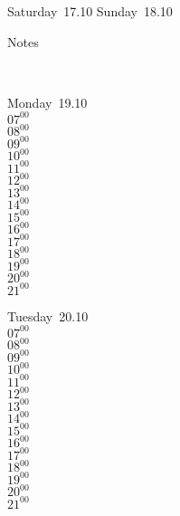 \documentclass[11pt,a4paper]{book}\usepackage[]{graphicx}\usepackage[]{color}
\begin{document}
{{{{{{{{{{{{{{{{\begin{tcolorbox}
\end{tcolorbox} 
\begin{tcolorbox}[height=(\textheight-10mm)/6]
Saturday~17.10
\tcblower
Sunday~18.10
\end{tcolorbox} %
\begin{tcolorbox}[height=(\textheight-10mm)/6,sidebyside=false]
Notes
\end{tcolorbox}
\clearpage
\vspace{2 mm}\\
\begin{tcolorbox}
Monday~19.10\\
{ 
  $07^{00}$\\
$08^{00}$\\
$09^{00}$\\
$10^{00}$\\
$11^{00}$\\
$12^{00}$\\
$13^{00}$\\
$14^{00}$\\
$15^{00}$\\
$16^{00}$\\
$17^{00}$\\
$18^{00}$\\
$19^{00}$\\
$20^{00}$\\
$21^{00}$}\\

\end{tcolorbox}
\begin{tcolorbox}
Tuesday~20.10\\
{ 
  $07^{00}$\\
$08^{00}$\\
$09^{00}$\\
$10^{00}$\\
$11^{00}$\\
$12^{00}$\\
$13^{00}$\\
$14^{00}$\\
$15^{00}$\\
$16^{00}$\\
$17^{00}$\\
$18^{00}$\\
$19^{00}$\\
$20^{00}$\\
$21^{00}$}\\


\end{tcolorbox}}}}}}}}}}}}}}}}}
\end{document}
